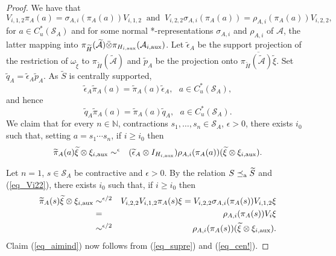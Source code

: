 \documentclass[11pt]{amsart}
\theoremstyle{definition}
\newcommand{\cl}[1]{\mathcal{#1}}
\providecommand{\wt}[1]{\widetilde{#1}}
\newcommand{\N}{\mathbb{N}}
\begin{document}
\begin{proof}
We have that 
\begin{equation}\label{eq_Vi22}
V_{i,1,2}\pi_A(a) =\sigma_{A,i}(\pi_A(a))V_{i,1,2}\ \mbox{ and } \ 
V_{i,2,2}\sigma_{A,i}(\pi_A(a))= \rho_{A,i}(\pi_A(a))V_{i,2,2},
\end{equation}
for $a\in C_u^*(\cl S_A)$ and 
for some normal *-representations $\sigma_{A,i}$ and $\rho_{A,i}$ of $\cl A$, the latter mapping into $\pi_{\wt{H}}(\wt{\cl A})\bar\otimes\pi_{H_{i,\rm aux}}(\cl A_{i,\rm aux})$.
Let $\wt{\epsilon}_{A}$ be the support projection of 
the restriction of $\omega_{\wt{\xi}}$ to $\pi_{\wt{H}}({\wt{\cl A}})$
and $\wt{p}_A$ be the projection onto $\overline{\pi_{\wt{H}}(\wt{\cl A})\wt{\xi}}$. 
Set $\wt{q}_A = \wt{\epsilon}_A\wt{p}_A$. As $\wt{S}$ is centrally supported, 
\begin{equation}\label{eq_cen!}
\wt{\epsilon}_A\wt{\pi}_A(a) = \wt{\pi}_A(a)\wt{\epsilon}_A, 
\ \ \ a\in C_u^*(\cl S_A), 
\end{equation}
and hence 
\begin{equation}\label{eq_wtq}
\wt{q}_A\wt{\pi}_A(a) = \wt{\pi}_A(a)\wt{q}_A, \ \ \ a\in C_u^*(\cl S_A).
\end{equation}
We claim that for every $n\in\N$, contractions $s_1,\dots,s_n\in\cl S_A$, $\epsilon>0$, there exists $i_{0}$ such that, 
setting $a=s_1\cdots s_n$, if $i\geq i_{0}$ then
\begin{eqnarray}\label{eq_aimind}
\wt{\pi}_A(a)\wt{\xi}\otimes\xi_{i,{\rm aux}}
& \sim^{\epsilon} & (\wt{\epsilon}_A
\otimes I_{H_{i,{\rm aux}}})\rho_{A,i}(\pi_A(a))(\wt{\xi}\otimes
\xi_{i,{\rm aux}}).
\end{eqnarray}

Let $n=1$, $s\in\cl S_A$ be contractive and $\epsilon > 0$. By the relation $S\preceq_{\rm a} \wt{S}$ and (\ref{eq_Vi22}), there exists $i_0$ such that, if $i\geq i_0$ then 
\begin{eqnarray*}
\wt{\pi}_A(s)\wt{\xi}\otimes\xi_{i,\rm aux}
& \sim^{\epsilon/2} &
V_{i,2,2}V_{i,1,2}\pi_A(s)\xi = V_{i,2,2}\sigma_{A,i}(\pi_A(s))V_{i,1,2}\xi\\
& = & \rho_{A,i}(\pi_A(s))V_i\xi\\
& \sim^{\epsilon/2}&
\rho_{A,i}(\pi_A(s))(\wt{\xi}\otimes\xi_{i,\rm aux}).
\end{eqnarray*} 
Claim (\ref{eq_aimind}) now follows from (\ref{eq_supre}) and (\ref{eq_cen!}).


\end{proof}
\end{document}
